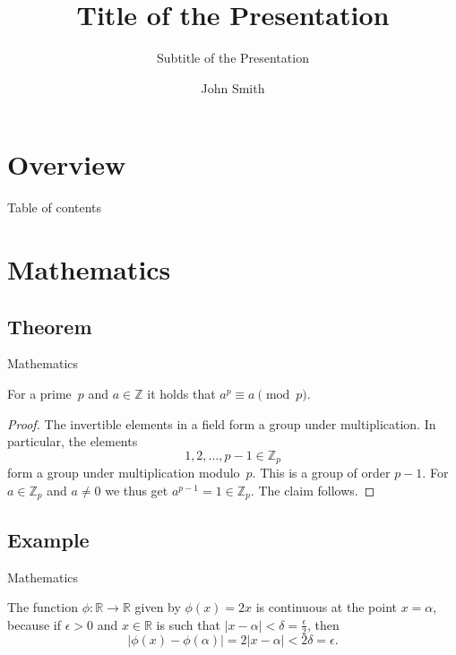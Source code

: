 \documentclass[english,MathSerif,aspectratio=169]{beamer}
\author{John Smith}
\title{Title of the Presentation}
\subtitle{Subtitle of the Presentation}
\begin{document}
\section{Overview}


%
%
\begin{frame}{Table of contents}
    \tableofcontents[currentsection]
\end{frame}


\section{Mathematics}
\subsection{Theorem}


\begin{frame}{Mathematics}
    \begin{theorem}
        For a prime~\(p\) and \(a \in \mathbb{Z}\) it holds that \(a^p \equiv a \pmod{p}\).
    \end{theorem}

    \begin{proof}
        The invertible elements in a field form a group under multiplication.
        In particular, the elements
        \begin{equation*}
            1, 2, \ldots, p - 1 \in \mathbb{Z}_p
        \end{equation*}
        form a group under multiplication modulo~\(p\).
        This is a group of order \(p - 1\).
        For \(a \in \mathbb{Z}_p\) and \(a \neq 0\) we thus get \(a^{p-1} = 1 \in \mathbb{Z}_p\).
        The claim follows.
    \end{proof}
\end{frame}


\subsection{Example}


\begin{frame}{Mathematics}
    \begin{example}
        The function \(\phi \colon \mathbb{R} \to \mathbb{R}\) given by \(\phi(x) = 2x\) is continuous at the point \(x = \alpha\),
        because if \(\epsilon > 0\) and \(x \in \mathbb{R}\) is such that \(\lvert x - \alpha \rvert < \delta = \frac{\epsilon}{2}\),
        then
        \begin{equation*}
            \lvert \phi(x) - \phi(\alpha)\rvert = 2\lvert x - \alpha \rvert < 2\delta = \epsilon.
        \end{equation*}
    \end{example}
\end{frame}
\end{document}
